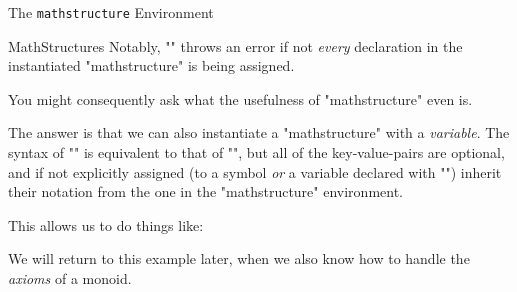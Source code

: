 \begin{sfragment}{The \texttt{mathstructure} Environment}
\begin{smodule}[ns=https://github.com/slatex/sTeX/doc]{MathStructures}
        Notably, \stexcode"\instantiate" throws an error if not \emph{every}
        declaration in the instantiated \stexcode"mathstructure" is being assigned.
        
        You might consequently ask what the usefulness of \stexcode"mathstructure"
        even is.

        \begin{function}{\varinstantiate}
            The answer is that we can also instantiate a 
            \stexcode"mathstructure" with a \emph{variable}.
            The syntax of \stexcode"\varianstantiate" is equivalent
            to that of \stexcode"\instantiate", but all of the key-value-pairs
            are optional, and if not explicitly assigned (to a symbol \emph{or}
            a variable declared with \stexcode"\vardef") inherit their notation
            from the one in the \stexcode"mathstructure" environment.
        \end{function}

        This allows us to do things like:


        We will return to this example later, when we also know
        how to handle the \emph{axioms} of a monoid.
\end{smodule}
\end{sfragment}

